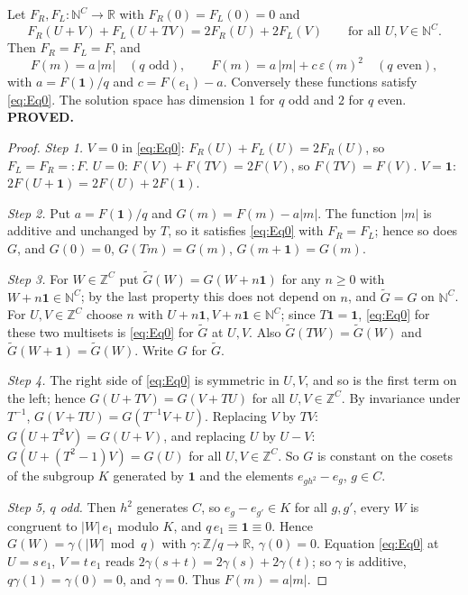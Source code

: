 \begin{proposition}\label{prop:solveq}
Let $F_R,F_L\colon\mathbb{N}^C\to\mathbb{R}$ with $F_R(0)=F_L(0)=0$ and
\begin{equation}\label{eq:Eq0}
F_R(U+V)+F_L(U+TV)=2F_R(U)+2F_L(V)\qquad\text{for all }U,V\in\mathbb{N}^C .
\end{equation}
Then $F_R=F_L=F$, and
\[
F(m)=a\,|m|\quad(q\text{ odd}),\qquad F(m)=a\,|m|+c\,\varepsilon(m)^2\quad(q\text{ even}),
\]
with $a=F(\mathbf{1})/q$ and $c=F(e_1)-a$. Conversely these functions satisfy \eqref{eq:Eq0}. The solution space has dimension $1$ for $q$ odd and $2$ for $q$ even. \textbf{PROVED.}
\end{proposition}
\begin{proof}
\emph{Step 1.} $V=0$ in \eqref{eq:Eq0}: $F_R(U)+F_L(U)=2F_R(U)$, so $F_L=F_R=:F$. $U=0$: $F(V)+F(TV)=2F(V)$, so $F(TV)=F(V)$. $V=\mathbf{1}$: $2F(U+\mathbf{1})=2F(U)+2F(\mathbf{1})$.

\emph{Step 2.} Put $a=F(\mathbf{1})/q$ and $G(m)=F(m)-a|m|$. The function $|m|$ is additive and unchanged by $T$, so it satisfies \eqref{eq:Eq0} with $F_R=F_L$; hence so does $G$, and $G(0)=0$, $G(Tm)=G(m)$, $G(m+\mathbf{1})=G(m)$.

\emph{Step 3.} For $W\in\mathbb{Z}^C$ put $\tilde G(W)=G(W+n\mathbf{1})$ for any $n\ge0$ with $W+n\mathbf{1}\in\mathbb{N}^C$; by the last property this does not depend on $n$, and $\tilde G=G$ on $\mathbb{N}^C$. For $U,V\in\mathbb{Z}^C$ choose $n$ with $U+n\mathbf{1},V+n\mathbf{1}\in\mathbb{N}^C$; since $T\mathbf{1}=\mathbf{1}$, \eqref{eq:Eq0} for these two multisets is \eqref{eq:Eq0} for $\tilde G$ at $U,V$. Also $\tilde G(TW)=\tilde G(W)$ and $\tilde G(W+\mathbf{1})=\tilde G(W)$. Write $G$ for $\tilde G$.

\emph{Step 4.} The right side of \eqref{eq:Eq0} is symmetric in $U,V$, and so is the first term on the left; hence $G(U+TV)=G(V+TU)$ for all $U,V\in\mathbb{Z}^C$. By invariance under $T^{-1}$, $G(V+TU)=G(T^{-1}V+U)$. Replacing $V$ by $TV$: $G(U+T^2V)=G(U+V)$, and replacing $U$ by $U-V$: $G(U+(T^2-1)V)=G(U)$ for all $U,V\in\mathbb{Z}^C$. So $G$ is constant on the cosets of the subgroup $K$ generated by $\mathbf{1}$ and the elements $e_{gh^2}-e_g$, $g\in C$.

\emph{Step 5, $q$ odd.} Then $h^2$ generates $C$, so $e_g-e_{g'}\in K$ for all $g,g'$, every $W$ is congruent to $|W|\,e_1$ modulo $K$, and $q\,e_1\equiv\mathbf{1}\equiv0$. Hence $G(W)=\gamma(|W|\bmod q)$ with $\gamma\colon\mathbb{Z}/q\to\mathbb{R}$, $\gamma(0)=0$. Equation \eqref{eq:Eq0} at $U=s\,e_1$, $V=t\,e_1$ reads $2\gamma(s+t)=2\gamma(s)+2\gamma(t)$; so $\gamma$ is additive, $q\gamma(1)=\gamma(0)=0$, and $\gamma=0$. Thus $F(m)=a|m|$.


\end{proof}
